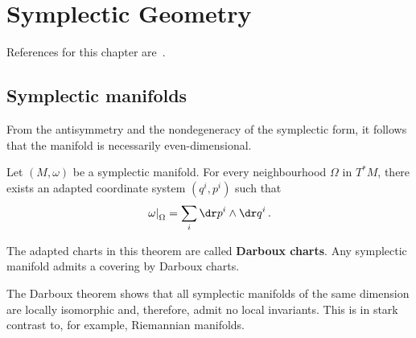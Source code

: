 \chapter{Symplectic Geometry}\label{chapter:symplectic}

    References for this chapter are~\cite{mcduff_introduction_2017,cardin_elementary_2015}.

\section{Symplectic manifolds}


    \begin{property}[Dimension]
        From the antisymmetry and the nondegeneracy of the symplectic form, it follows that the manifold is necessarily even-dimensional.
    \end{property}

    \begin{theorem}[Darboux]
        Let $(M,\omega)$ be a symplectic manifold. For every neighbourhood $\Omega$ in $T^*M$, there exists an adapted coordinate system $(q^i,p^i)$ such that
        \begin{gather}
            \left.\omega\right|_\Omega = \sum_i\dr p^i\wedge\dr q^i\,.
        \end{gather}
    \end{theorem}
    The adapted charts in this theorem are called \textbf{Darboux charts}. Any symplectic manifold admits a covering by Darboux charts.
    \begin{remark}
        The Darboux theorem shows that all symplectic manifolds of the same dimension are locally isomorphic and, therefore, admit no local invariants. This is in stark contrast to, for example, Riemannian manifolds.
    \end{remark}

